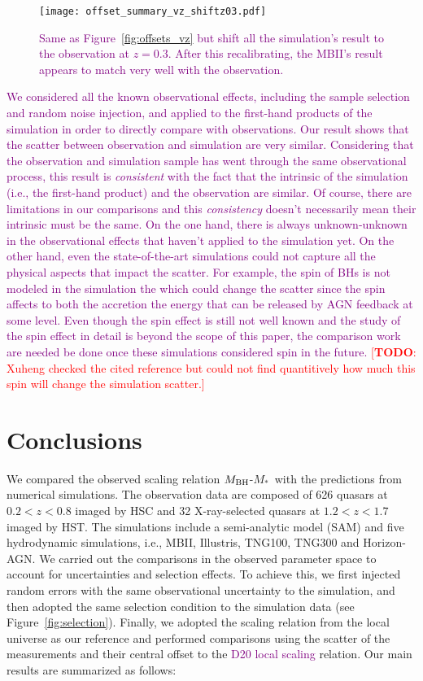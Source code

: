 \documentclass[twocolumn]{aastex631}
\newcommand{\todo}[1]{\textcolor{red}{[{\bf TODO}: #1]}}
\newcommand{\red}[1]{\textcolor{purple}{#1}}
\def\smass{{$M_*$}}
\def\mbh{$M_{\rm BH}$}
\begin{document}
\begin{figure}
\centering
\texttt{[image: offset\_summary\_vz\_shiftz03.pdf]}
\caption{\label{fig:offsets_vz_shiftz03} 
\red{Same as Figure~\ref{fig:offsets_vz} but shift all the simulation's result to the observation at $z=0.3$. After this recalibrating, the MBII's result appears to match very well with the observation.}
}
\end{figure} 

\red{We considered all the known observational effects, including the sample selection and random noise injection, and applied to the first-hand products of the simulation in order to directly compare with observations. Our result shows that the scatter between observation and simulation are very similar. Considering that the observation and simulation sample has went through the same observational process, this result is {\it consistent} with the fact that the intrinsic of the simulation (i.e., the first-hand product) and the observation are similar. Of course, there are limitations in our comparisons and this {\it consistency} doesn't necessarily mean their intrinsic must be the same. On the one hand, there is always unknown-unknown in the observational effects that haven't applied to the simulation yet. On the other hand, even the state-of-the-art simulations could not capture all the physical aspects that impact the scatter. For example, the spin of BHs is not modeled in the simulation the which could change the scatter since the spin affects to both the accretion the energy that can be released by AGN feedback \citep{Dubois2014, 2019MNRAS.490.4133B, Habouzit2021} at some level. Even though the spin effect is still not well known and the study of the spin effect in detail is beyond the scope of this paper, the comparison work are needed be done once these simulations considered spin in the future. 
 \todo{Xuheng checked the cited reference but could not find quantitively how much this spin will change the simulation scatter.}
}

\section{Conclusions} \label{sec:con}
We compared the observed scaling relation \mbh-\smass\ with the predictions from numerical simulations. The observation data are composed of 626 quasars at $0.2 < z < 0.8$ imaged by HSC and 32 X-ray-selected quasars at $1.2 < z < 1.7$ imaged by HST. The simulations include a semi-analytic model (SAM) and five hydrodynamic simulations, i.e., MBII, Illustris, TNG100, TNG300 and Horizon-AGN. We carried out the comparisons in the observed parameter space to account for uncertainties and selection effects. To achieve this, we first injected random errors with the same observational uncertainty to the simulation, and then adopted the same selection condition to the simulation data (see Figure~\ref{fig:selection}). Finally, we adopted the scaling relation from the local universe as our reference and performed comparisons using the scatter of the measurements and their central offset to the \red{D20 local scaling} relation. Our main results are summarized as follows:
\end{document}
